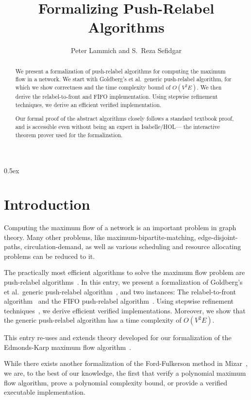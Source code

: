 \documentclass[11pt,a4paper]{article}
\begin{document}
\title{Formalizing Push-Relabel Algorithms}
\author{Peter Lammich and S.~Reza Sefidgar}
\maketitle

\begin{abstract}
We present a formalization of push-relabel algorithms for computing the 
maximum flow in a network. We start with Goldberg's et al.~generic push-relabel
algorithm, for which we show correctness and the time complexity bound of 
$O(V^2E)$. We then derive the relabel-to-front and FIFO implementation.
Using stepwise refinement techniques, we derive an efficient verified 
implementation.

Our formal proof of the abstract algorithms closely follows a standard textbook 
proof, and is accessible even without being an expert 
in Isabelle/HOL--- the interactive theorem prover used for the formalization.
\end{abstract}

\clearpage
\tableofcontents

\clearpage

\parindent 0pt\parskip 0.5ex

\section{Introduction}
Computing the maximum flow of a network is an important problem in graph theory.
Many other problems, like maximum-bipartite-matching, edge-disjoint-paths,
circulation-demand, as well as various scheduling and resource allocating
problems can be reduced to it. 

The practically most efficient algorithms to solve the maximum flow problem
are push-relabel algorithms~\cite{ChGo97}. In this entry, we present 
a formalization of Goldberg's et al.\ generic push-relabel algorithm~\cite{GoTa88}, 
and two instances: The relabel-to-front algorithm~\cite{CLRS09} and the 
FIFO push-relabel algorithm~\cite{GoTa88}. 
Using stepwise refinement techniques~\cite{Wirth71,Back78,BaWr98}, we derive 
efficient verified implementations. Moreover, we show that the generic 
push-relabel algorithm has a time complexity of $O(V^2E)$.

This entry re-uses and extends theory developed for our formalization of
the Edmonds-Karp maximum flow algorithm~\cite{LaSe16,LaSe16_afp}.

While there exists another formalization of the Ford-Fulkerson method in
Mizar~\cite{Lee05}, we are, to the best of our knowledge, the first that verify
a polynomial maximum flow algorithm, prove a polynomial complexity bound, or
provide a verified executable implementation.
\end{document}
